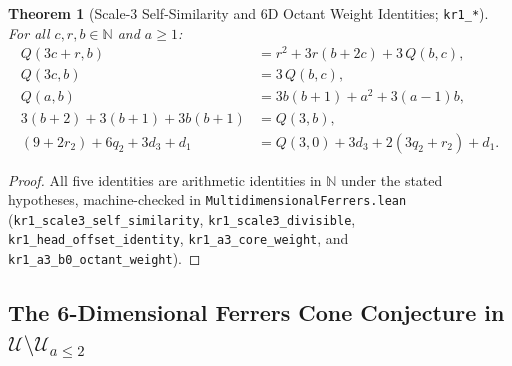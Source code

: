 \documentclass[11pt]{article}
\newtheorem{theorem}{Theorem}[section]
\theoremstyle{definition}
\newcommand{\N}{\mathbb{N}}
\begin{document}
\begin{theorem}[Scale-3 Self-Similarity and 6D Octant Weight Identities; \texttt{kr1\_*}]
\label{thm:kr1-identities}
For all $c, r, b \in \N$ and $a \ge 1$:
\begin{align}
  Q(3c + r, b) &= r^2 + 3r(b + 2c) + 3\,Q(b, c), \label{eq:self-sim}\\
  Q(3c, b) &= 3\,Q(b, c), \label{eq:scale3}\\
  Q(a, b) &= 3b(b + 1) + a^2 + 3(a - 1)b, \label{eq:head-offset}\\
  3(b + 2) + 3(b + 1) + 3b(b + 1) &= Q(3, b), \label{eq:a3-core}\\
  (9 + 2r_2) + 6q_2 + 3d_3 + d_1 &= Q(3, 0) + 3d_3 + 2(3q_2 + r_2) + d_1. \label{eq:octant}
\end{align}
\end{theorem}
\begin{proof}
All five identities are arithmetic identities in $\N$ under the stated hypotheses, machine-checked in \nolinkurl{MultidimensionalFerrers.lean} (\nolinkurl{kr1_scale3_self_similarity}, \texttt{kr1\_scale3\_divisible}, \nolinkurl{kr1_head_offset_identity}, \texttt{kr1\_a3\_core\_weight}, and \nolinkurl{kr1_a3_b0_octant_weight}).
\end{proof}

\subsection{The 6-Dimensional Ferrers Cone Conjecture in $\mathcal{U} \setminus \mathcal{U}_{a \le 2}$}
\end{document}
